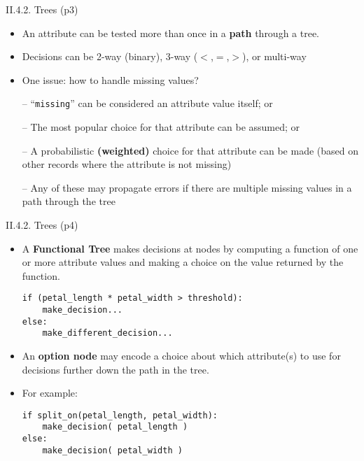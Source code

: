 \documentclass[handout]{beamer}
\newcommand{\strong}[1]{\textbf{\color{teal} #1}}
\begin{document}
\begin{frame}{II.4.2. Trees (p3)}
\begin{itemize}
\item An attribute can be tested more than once in a \strong{path} through a tree.
\item Decisions can be 2-way (binary), 3-way ($<$,$=$,$>$), or multi-way
\item[]
\item One issue: how to handle missing values?
\item[--] ``\texttt{missing}'' can be considered an attribute value itself; or
\item[--] The most popular choice for that attribute can be assumed; or
\item[--] A probabilistic \strong{(weighted)} choice for that attribute can be made (based on other records where the attribute is not missing)
\item[--] Any of these may propagate errors if there are multiple missing values in a path through the tree
\end{itemize}
\end{frame}
\begin{frame}[fragile]{II.4.2. Trees (p4)}
\begin{itemize}
\item A \strong{Functional Tree} makes decisions at nodes by computing a function of one or more attribute values and making a choice on the value returned by the function.
\begin{lstlisting}[numbers=none]
if (petal_length * petal_width > threshold):
	make_decision...
else:
	make_different_decision...
\end{lstlisting}
%
\item An \strong{option node} may encode a choice about which attribute(s) to use for decisions further down the path in the tree.
\item For example:
\begin{lstlisting}[numbers=none]
if split_on(petal_length, petal_width):
	make_decision( petal_length )
else:
	make_decision( petal_width )
\end{lstlisting}
\end{itemize}
\end{frame}
\end{document}
